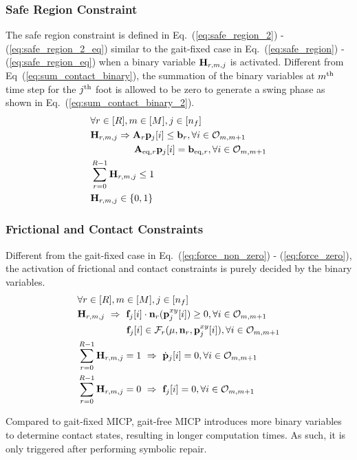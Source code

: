 \subsubsection{Safe Region Constraint}
The safe region constraint is defined in Eq.~(\ref{eq:safe_region_2}) - (\ref{eq:safe_region_2_eq}) similar to the gait-fixed case in Eq.~(\ref{eq:safe_region}) - (\ref{eq:safe_region_eq}) when a binary variable $\mathbf{H}_{r,m,j}$ is activated. Different from Eq~(\ref{eq:sum_contact_binary}), the summation of the binary variables at $m^{\rm th}$ time step for the $j^{\rm th}$ foot is allowed to be zero to generate a swing phase as shown in Eq.~(\ref{eq:sum_contact_binary_2}).
\begin{align}
\nonumber &\forall r \in [R], m \in [M], j \in [n_f]\\    \label{eq:safe_region_2} &\mathbf{H}_{r,m,j} \Rightarrow \mathbf{A}_r \mathbf{p}_j[i] \leq \mathbf{b}_r, \forall i \in \mathcal{O}_{m,m+1}\\
    \label{eq:safe_region_2_eq} & \hspace{1.6cm} \mathbf{A}_{\text{eq},r} \mathbf{p}_j[i] = \mathbf{b}_{\text{eq},r}, \forall i \in \mathcal{O}_{m,m+1}
        \\\label{eq:sum_contact_binary_2} &\sum_{r=0}^{R-1}\mathbf{H}_{r,m,j} \leq 1
        \\&\mathbf{H}_{r,m,j} \in \{0, 1\}
\end{align}

\subsubsection{Frictional and Contact Constraints}
Different from the gait-fixed case in Eq.~(\ref{eq:force_non_zero}) - (\ref{eq:force_zero}), the activation of frictional and contact constraints is purely decided by the binary variables.
\begin{align}
    \nonumber & \forall r \in [R], m \in [M], j \in [n_f]\\    \label{eq:force_non_zero_2} & \mathbf{H}_{r,m,j} \  \Rightarrow \ \mathbf{f}_j[i] \cdot \mathbf{n}_r(\mathbf{p}_j^{xy}[i]) \ge 0, \forall i \in \mathcal{O}_{m,m+1}\\
    \label{eq:force_friction_cone_2}
        & \hspace{1.8cm} \mathbf{f}_j[i] \in \mathcal{F}_r(\mu, \mathbf{n}_r, \mathbf{p}_j^{xy}[i]), \forall i \in \mathcal{O}_{m,m+1}
         \\\label{eq:ee_velocity_zero_2} &
        \sum_{r=0}^{R-1}\mathbf{H}_{r,m,j} = 1 \ \Rightarrow \  \dot{\mathbf{p}}_j[i]=0, \forall i \in \mathcal{O}_{m,m+1}
        \\\label{eq:force_zero_2} &
         \sum_{r=0}^{R-1}\mathbf{H}_{r,m,j} = 0 \ \Rightarrow \ \mathbf{f}_j[i] = 0, \forall i \in \mathcal{O}_{m,m+1}
\end{align}

Compared to gait-fixed MICP, gait-free MICP introduces more binary variables to determine contact states, resulting in longer computation times. As such, it is only triggered after performing symbolic repair.